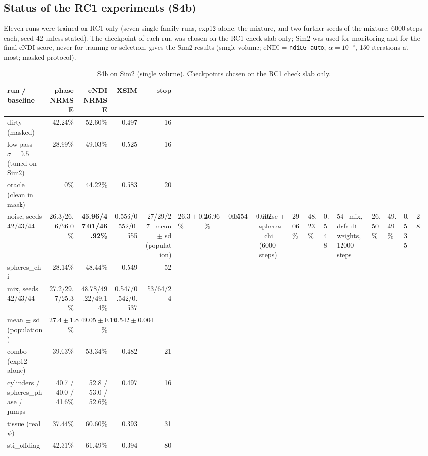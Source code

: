 \documentclass[11pt]{article}
\newcommand{\code}[1]{\texttt{#1}}
\theoremstyle{remark}
\begin{document}
\subsection{Status of the RC1 experiments (S4b)}
Eleven runs were trained on RC1 only (seven single-family runs, exp12 alone, the mixture, and two further seeds of the mixture; $6000$ steps each, seed $42$ unless stated).
The checkpoint of each run was chosen on the RC1 check slab only; Sim2 was used for monitoring and for the final eNDI score, never for training or selection.
 gives the Sim2 results (single volume; eNDI = \code{ndiCG\_auto}, $\alpha=10^{-5}$, 150 iterations at most; masked protocol).
\begin{table}[h]
\centering\small
\begin{tabular}{lrrrr}
\hline
run / baseline & phase NRMSE & eNDI NRMSE & XSIM & stop \\ \hline
dirty (masked) & 42.24\% & 52.60\% & 0.497 & 16 \\
low-pass $\sigma=0.5$ (tuned on Sim2) & 28.99\% & 49.03\% & 0.525 & 16 \\
oracle (clean in mask) & 0\% & 44.22\% & 0.583 & 20 \\ \hline
noise, seeds 42/43/44 & 26.3/26.6/26.0\% & \textbf{46.96/47.01/46.92\%} & 0.556/0.552/0.555 & 27/29/27 \
\quad mean $\pm$ sd (population) & $26.3\pm0.2$\% & $\mathbf{46.96\pm0.04}$\% & $0.554\pm0.002$ & \
noise + spheres\_chi (6000 steps) & 29.06\% & 48.23\% & 0.548 & 54 \
mix, default weights, 12000 steps & 26.50\% & 49.49\% & 0.535 & 28 \\
spheres\_chi & 28.14\% & 48.44\% & 0.549 & 52 \\
mix, seeds 42/43/44 & 27.2/29.7/25.3\% & 48.78/49.22/49.14\% & 0.547/0.542/0.537 & 53/64/24 \\
\quad mean $\pm$ sd (population) & $27.4\pm1.8$\% & $49.05\pm0.19$\% & $0.542\pm0.004$ & \\
combo (exp12 alone) & 39.03\% & 53.34\% & 0.482 & 21 \\
cylinders / spheres\_phase / jumps & 40.7 / 40.0 / 41.6\% & 52.8 / 53.0 / 52.6\% & 0.497 & 16 \\
tissue (real $\psi$) & 37.44\% & 60.60\% & 0.393 & 31 \\
sti\_offdiag & 42.31\% & 61.49\% & 0.394 & 80 \\ \hline
\end{tabular}
\caption{S4b on Sim2 (single volume). Checkpoints chosen on the RC1 check slab only.}\label{tab:s4b}
\end{table}
\end{document}
